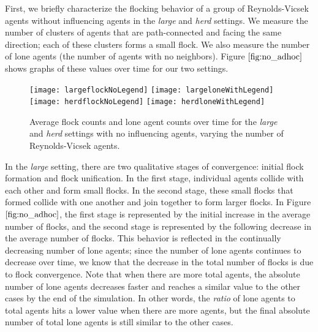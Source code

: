 First, we briefly characterize the flocking behavior of a group of Reynolds-Vicsek
agents without influencing agents in the \textit{large} and \textit{herd} settings.
We measure the number of clusters of agents that are path-connected and facing the
same direction; each of these clusters forms a small flock.
We also measure the number of lone agents (the number of agents with no neighbors).
Figure $\ref{fig:no_adhoc}$ shows graphs of these values over time for our two
settings.
\begin{figure}
    \centering
    \texttt{[image: largeflockNoLegend]}
    \texttt{[image: largeloneWithLegend]}
    \texttt{[image: herdflockNoLegend]}
    \texttt{[image: herdloneWithLegend]}
    \caption{Average flock counts and lone agent counts over time for the
    \textit{large} and \textit{herd} settings with no influencing agents,
    varying the number of Reynolds-Vicsek agents.}
    \label{fig:no_adhoc}
\end{figure}

In the \textit{large} setting, there are two qualitative stages of convergence:
initial flock formation and flock unification.
In the first stage, individual agents collide with each other and form small
flocks.
In the second stage, these small flocks that formed collide with one another and
join together to form larger flocks.
In Figure $\ref{fig:no_adhoc}$, the first stage is represented by the initial
increase in the average number of flocks, and the second stage is represented
by the following decrease in the average number of flocks.
This behavior is reflected in the continually decreasing number of lone agents;
since the number of lone agents continues to decrease over time, we know that the
decrease in the total number of flocks is due to flock convergence.
Note that when there are more total agents, the absolute number of lone agents
decreases faster and reaches a similar value to the other cases by the end of the
simulation.
In other words, the \textit{ratio} of lone agents to total agents hits a
lower value when there are more agents, but the final absolute number of total
lone agents is still similar to the other cases.

